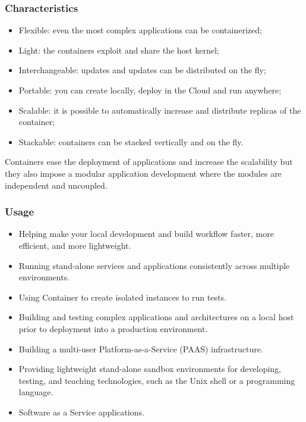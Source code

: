 \documentclass[10pt, oneside]{article}
\begin{document}
\subsubsection{Characteristics}
\begin{itemize}
    \item Flexible: even the most complex applications can be containerized;
    \item Light: the containers exploit and share the host kernel;
    \item Interchangeable: updates and updates can be distributed on the fly;
    \item Portable: you can create locally, deploy in the Cloud and run anywhere;
    \item Scalable: it is possible to automatically increase and distribute replicas of the container;
    \item Stackable: containers can be stacked vertically and on the fly.
\end{itemize}
Containers ease the deployment of applications and increase the scalability but they also impose a modular application development where the modules are independent and uncoupled.
\subsubsection{Usage}
\begin{itemize}
    \item Helping make your local development and build workflow faster, more efficient, and more lightweight.
    \item Running stand-alone services and applications consistently across multiple environments.
    \item Using Container to create isolated instances to run tests.
    \item Building and testing complex applications and architectures on a
    local host prior to deployment into a production environment.
    \item Building a multi-user Platform-as-a-Service (PAAS) infrastructure.
    \item Providing lightweight stand-alone sandbox environments for developing, testing, and teaching technologies, such as the Unix shell or a programming language.
    \item Software as a Service applications.
\end{itemize}

\newpage
\end{document}
